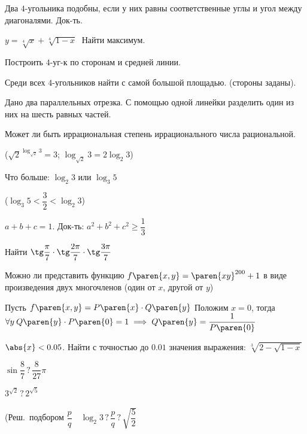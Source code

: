 \documentclass{article}
\newcommand{\strikethrough}[1]{}  %
\begin{document}
\problem  %
Два $4$-угольника подобны, если у них равны соответственные углы и угол между диагоналями.
Док-ть.


\problem  %
$y = \sqrt[4]{x} + \sqrt[4]{1 - x} \;$
Найти максимум.


\problem  %
Построить $4$-уг-к по сторонам и средней линии.


\problem  %
Среди всех $4$-угольников найти с самой большой площадью. (стороны заданы).


\problem  %
Дано два параллельных отрезка.
С помощью одной линейки разделить один из них на шесть равных частей.


\problem  %
Может ли быть иррациональная степень иррационального числа рациональной.

($\sqrt{2}^{\log_{\sqrt{2}}{3}} = 3$; $\log_{\sqrt{2}}{3} = 2 \log_{2}{3}$)


\problem  %
Что больше: $\log_2 3$ или $\log_3 5$

($\log_{3}{5} < \dfrac{3}{2} < \log_{2}{3}$)


\problem  %
$a + b + c = 1$.
Док-ть: $a^2 + b^2 + c^2 \geq \dfrac{1}{3}$


\problem  %
Найти $\tg\dfrac{\pi}{7} \cdot \tg\dfrac{2\pi}{7} \cdot \tg\dfrac{3\pi}{7}$


\problem  %
Можно ли представить функцию $f\paren{x, y} = \paren{x y}^{200} + 1$
в виде произведения двух многочленов (один от $x$, другой от $y$)

\strikethrough{$\paren{\varphi\paren{x} \pm 1} \paren{\psi\paren{y} \pm 1}
                = \varphi\paren{x} \psi\paren{y} \pm \varphi\paren{x} \pm \psi\paren{y} + 1$}

Пусть $f\paren{x, y} = P\paren{x} \cdot Q\paren{y}$
Положим $x = 0$, тогда
$\forall y \: Q\paren{y} \cdot P\paren{0} = 1
 \implies
 Q\paren{y} = \dfrac{1}{P\paren{0}}$
\strikethrough{Тогда $Q\paren{y}$ - имеет бесконечно много корней.}


\problem  %
$\abs{x} < 0.05$.
Найти с точностью до $0.01$ значения выражения: $\sqrt[3]{2 - \sqrt{1 - x}}$


\problem  %
$\sin\dfrac{8}{7} \mathrel{?} \dfrac{8}{27} \pi$


\problem  %
$3^{\sqrt{2}} \mathrel{?} 2^{\sqrt{5}}$

(Реш.\ подбором $\dfrac{p}{q} \quad \log_{2}{3} \mathrel{?} \dfrac{p}{q} \mathrel{?} \sqrt{\dfrac{5}{2}}$
\end{document}
